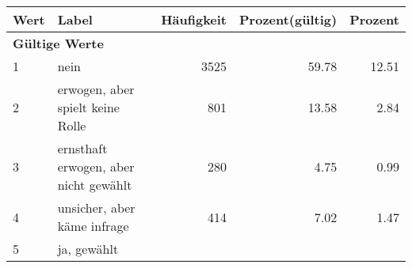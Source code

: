      \begin{longtable}{lXrrr}
     \toprule
     \textbf{Wert} & \textbf{Label} & \textbf{Häufigkeit} & \textbf{Prozent(gültig)} & \textbf{Prozent} \\
     \endhead
     \midrule
     \multicolumn{5}{l}{\textbf{Gültige Werte}}\\

     1 &
     \multicolumn{1}{X}{ nein   } &


       \num{3525} &
       \num[round-mode=places,round-precision=2]{59,78} &
         \num[round-mode=places,round-precision=2]{12,51} \\

     2 &
     \multicolumn{1}{X}{ erwogen, aber spielt keine Rolle   } &


       \num{801} &
       \num[round-mode=places,round-precision=2]{13,58} &
         \num[round-mode=places,round-precision=2]{2,84} \\

     3 &
     \multicolumn{1}{X}{ ernsthaft erwogen, aber nicht gewählt   } &


       \num{280} &
       \num[round-mode=places,round-precision=2]{4,75} &
         \num[round-mode=places,round-precision=2]{0,99} \\

     4 &
     \multicolumn{1}{X}{ unsicher, aber käme infrage   } &


       \num{414} &
       \num[round-mode=places,round-precision=2]{7,02} &
         \num[round-mode=places,round-precision=2]{1,47} \\

     5 &
     \multicolumn{1}{X}{ ja, gewählt   } &



\end{longtable}
